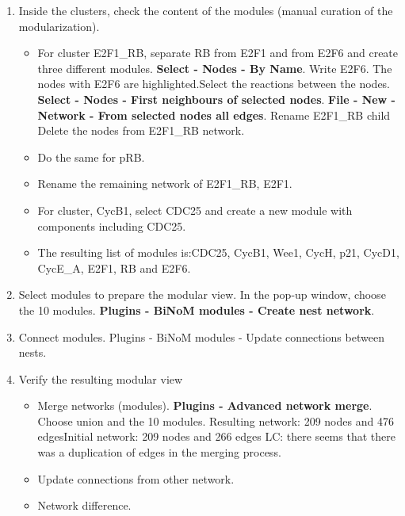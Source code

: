 \documentclass[a4paper,10pt]{article}
\begin{document}
\begin{enumerate}
\item	Inside the clusters, check the content of the modules (manual curation
of the modularization).

\begin{itemize}
\item	For cluster E2F1\_RB, separate RB from E2F1 and from E2F6 and create
three different modules. \textbf{Select - Nodes - By Name}. Write E2F6. The
nodes with E2F6 are highlighted.Select the reactions between the nodes.
\textbf{Select - Nodes - First neighbours of selected nodes}. \textbf{File - New
- Network - From selected nodes all edges}. Rename E2F1\_RB child Delete the
nodes from E2F1\_RB network.
\item	Do the same for pRB.
\item	Rename the remaining network of E2F1\_RB, E2F1.
\item	For cluster, CycB1, select CDC25 and create a new module with components
including CDC25.
\item	The resulting list of modules is:CDC25, CycB1, Wee1, CycH, p21, CycD1,
CycE\_A, E2F1, RB and E2F6.
\end{itemize}

\item	Select modules to prepare the modular view. In the pop-up window, choose
the 10 modules. \textbf{Plugins - BiNoM modules - Create nest network}.
\item	Connect modules. Plugins - BiNoM modules - Update connections between
nests.
\item   Verify the resulting modular view

\begin{itemize}
\item	Merge networks (modules). \textbf{Plugins - Advanced network merge}.
Choose union and the 10 modules. Resulting network: 209 nodes and 476
edgesInitial network: 209 nodes and 266 edges LC: there seems that there was a
duplication of edges in the merging process.
\item	Update connections from other network.
\item	Network difference.
\end{itemize}

\end{enumerate}
\end{document}
